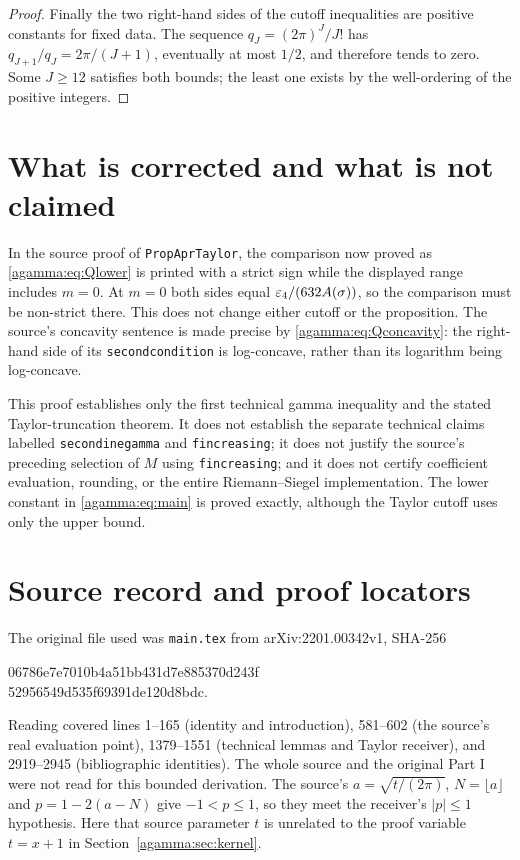 \begin{proof}
Finally the two right-hand sides of the cutoff inequalities are
positive constants for fixed data. The sequence $q_J=(2\pi)^J/J!$
has $q_{J+1}/q_J=2\pi/(J+1)$, eventually at most $1/2$, and
therefore tends to zero. Some $J\ge12$ satisfies both bounds;
the least one exists by the well-ordering of the positive integers.
\end{proof}

\section{What is corrected and what is not claimed}\label{agamma:sec:limits}
In the source proof of \texttt{PropAprTaylor}, the comparison now
proved as \eqref{agamma:eq:Qlower} is printed with a strict sign while the
displayed range includes $m=0$. At $m=0$ both sides equal
$\varepsilon_4/(632A(\sigma))$, so the comparison must be non-strict
there. This does not change either cutoff or the proposition.
The source's concavity sentence is made precise by
\eqref{agamma:eq:Qconcavity}: the right-hand side of its
\texttt{secondcondition} is log-concave, rather than its logarithm
being log-concave.

This proof establishes only the first technical gamma inequality
and the stated Taylor-truncation theorem. It does not establish
the separate technical claims labelled \texttt{secondinegamma}
and \texttt{fincreasing}; it does not justify the source's preceding
selection of $M$ using \texttt{fincreasing}; and it does not certify
coefficient evaluation, rounding, or the entire Riemann--Siegel
implementation. The lower constant in \eqref{agamma:eq:main} is proved
exactly, although the Taylor cutoff uses only the upper bound.

\section*{Source record and proof locators}
The original file used was \texttt{main.tex} from
arXiv:2201.00342v1, SHA-256
\begin{center}\small\ttfamily
06786e7e7010b4a51bb431d7e885370d243f\\
52956549d535f69391de120d8bdc.
\end{center}
Reading covered lines 1--165 (identity and introduction),
581--602 (the source's real evaluation point),
1379--1551 (technical lemmas and Taylor receiver), and
2919--2945 (bibliographic identities). The whole source and the
original Part I were not read for this bounded derivation.
The source's $a=\sqrt{t/(2\pi)}$, $N=\lfloor a\rfloor$ and
$p=1-2(a-N)$ give $-1<p\le1$, so they meet the receiver's
$|p|\le1$ hypothesis. Here that source parameter $t$ is unrelated
to the proof variable $t=x+1$ in Section~\ref{agamma:sec:kernel}.

